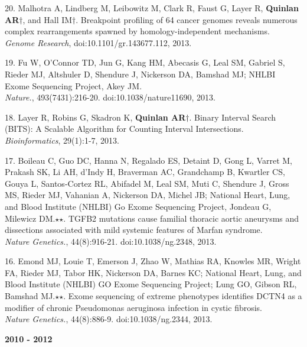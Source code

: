 \documentclass[margin,line]{cv}
\begin{document}
\begin{resume}
\begin{list}{*}{}
    \item[20.] Malhotra A, Lindberg M, Leibowitz M, Clark R, Faust G, Layer R, \textbf{Quinlan AR}$\dagger$, and Hall IM$\dagger$.
    Breakpoint profiling of 64 cancer genomes reveals numerous complex rearrangements spawned by homology-independent mechanisms. \\
    \emph{Genome Research}, doi:10.1101/gr.143677.112, 2013.

    \item[19.] Fu W, O'Connor TD, Jun G, Kang HM, Abecasis G, Leal SM, Gabriel S, Rieder MJ, Altshuler D, Shendure J, Nickerson DA, Bamshad MJ; NHLBI Exome Sequencing Project, Akey JM.\\
    \emph{Nature.}, 493(7431):216-20. doi:10.1038/nature11690, 2013.
	
    \item[18.] Layer R, Robins G, Skadron K, \textbf{Quinlan AR}$\dagger$. 
    Binary Interval Search (BITS): A Scalable Algorithm for Counting Interval Intersections.\\
    \emph{Bioinformatics}, 29(1):1-7, 2013.
	
    \item[17.] Boileau C, Guo DC, Hanna N, Regalado ES, Detaint D, Gong L, Varret M, Prakash SK, Li AH, d'Indy H, Braverman AC, Grandchamp B, Kwartler CS, Gouya L, Santos-Cortez RL, Abifadel M, Leal SM, Muti C, Shendure J, Gross MS, Rieder MJ, Vahanian A, Nickerson DA, Michel JB; National Heart, Lung, and Blood Institute (NHLBI) Go Exome Sequencing Project, Jondeau G, Milewicz DM.$\star$$\star$. TGFB2 mutations cause familial thoracic aortic aneurysms and dissections associated with mild systemic features of Marfan syndrome.\\
    \emph{Nature Genetics.}, 44(8):916-21. doi:10.1038/ng.2348, 2013.

    \item[16.] Emond MJ, Louie T, Emerson J, Zhao W, Mathias RA, Knowles MR, Wright FA, Rieder MJ, Tabor HK, Nickerson DA, Barnes KC; National Heart, Lung, and Blood Institute (NHLBI) GO Exome Sequencing Project; Lung GO, Gibson RL, Bamshad MJ.$\star$$\star$. Exome sequencing of extreme phenotypes identifies DCTN4 as a modifier of chronic Pseudomonas aeruginosa infection in cystic fibrosis.\\
    \emph{Nature Genetics.}, 44(8):886-9. doi:10.1038/ng.2344, 2013.

    \end{list}

    \textbf{2010 - 2012} \\
    \begin{list}{*}{}


\end{list}
\end{resume}
\end{document}
